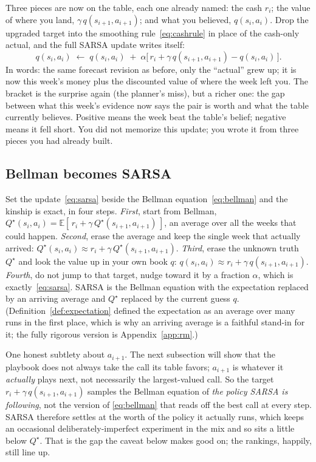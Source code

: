 \documentclass[11pt,a4paper]{article}
\theoremstyle{definition}
\theoremstyle{remark}
\numberwithin{equation}{section}
\newcommand{\E}{\mathbb{E}}
\begin{document}
Three pieces are now on the table, each one already named: the cash $r_i$; the value of where
you land, $\gamma\, q(s_{i+1}, a_{i+1})$; and what you believed, $q(s_i, a_i)$. Drop the
upgraded target into the smoothing rule~\eqref{eq:cashrule} in place of the cash-only actual,
and the full SARSA update writes itself:
\begin{equation}\label{eq:sarsa}
q(s_i, a_i) \;\leftarrow\; q(s_i, a_i)
\;+\; \alpha \bigl[\, r_i + \gamma\, q(s_{i+1}, a_{i+1}) - q(s_i, a_i) \,\bigr].
\end{equation}
In words: the same forecast revision as before, only the ``actual'' grew up; it is now this
week's money plus the discounted value of where the week left you. The bracket is the surprise
again (the planner's miss), but a richer one: the gap between what this week's evidence now
says the pair is worth and what the table currently believes. Positive means the week beat the
table's belief; negative means it fell short. You did not memorize this update; you wrote it
from three pieces you had already built.

\subsection*{Bellman becomes SARSA}

Set the update~\eqref{eq:sarsa} beside the Bellman equation~\eqref{eq:bellman} and the kinship
is exact, in four steps. \emph{First}, start from Bellman,
$Q^\star(s_i, a_i) = \E[\, r_i + \gamma\, Q^\star(s_{i+1}, a_{i+1}) \,]$, an average over all
the weeks that could happen. \emph{Second}, erase the average and keep the single week that
actually arrived: $Q^\star(s_i, a_i) \approx r_i + \gamma\, Q^\star(s_{i+1}, a_{i+1})$.
\emph{Third}, erase the unknown truth $Q^\star$ and look the value up in your own book $q$:
$q(s_i, a_i) \approx r_i + \gamma\, q(s_{i+1}, a_{i+1})$. \emph{Fourth}, do not jump to that
target, nudge toward it by a fraction $\alpha$, which is exactly~\eqref{eq:sarsa}. SARSA is the
Bellman equation with the expectation replaced by an arriving average and $Q^\star$ replaced by
the current guess $q$. (Definition~\ref{def:expectation} defined the expectation as an average
over many runs in the first place, which is why an arriving average is a faithful stand-in for
it; the fully rigorous version is Appendix~\ref{app:rm}.)

One honest subtlety about $a_{i+1}$. The next subsection will show that the playbook does not
always take the call its table favors; $a_{i+1}$ is whatever it \emph{actually} plays next,
not necessarily the largest-valued call. So the target $r_i + \gamma\, q(s_{i+1}, a_{i+1})$
samples the Bellman equation of \emph{the policy SARSA is following}, not the version of
\eqref{eq:bellman} that reads off the best call at every step. SARSA therefore settles at the
worth of the policy it actually runs, which keeps an occasional deliberately-imperfect
experiment in the mix and so sits a little below $Q^\star$. That is the gap the caveat below
makes good on; the rankings, happily, still line up.
\end{document}
